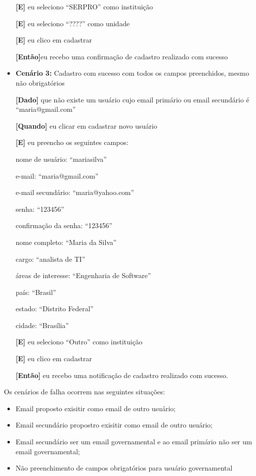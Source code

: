 \begin{itemize}
	\textbf{[E]} eu seleciono ``SERPRO'' como instituição

	\textbf{[E]} eu seleciono ``????'' como unidade  

	\textbf{[E]} eu clico em cadastrar

	\textbf{[Então]}eu recebo uma confirmação de cadastro realizado com sucesso

\item\textbf{Cenário 3:} Cadastro com sucesso com todos os campos preenchidos, mesmo não obrigatórios

	\textbf{[Dado]} que não existe um usuário cujo email primário ou email secundário é ``maria@gmail.com''

	\textbf{[Quando]} eu clicar em cadastrar novo usuário

	\textbf{[E]} eu preencho os seguintes campos: 

  		\subitem nome de usuário: ``mariasilva''

		  \subitem e-mail: ``maria@gmail.com''

		  \subitem e-mail secundário: ``maria@yahoo.com''

		  \subitem senha: ``123456''

		  \subitem confirmação da senha: ``123456''

		  \subitem nome completo: ``Maria da Silva''

		  \subitem cargo: ``analista de TI''

		  \subitem áreas de interesse: ``Engenharia de Software''

		  \subitem país: ``Brasil''

		  \subitem estado: ``Distrito Federal''

		  \subitem cidade: ``Brasília''

	\textbf{[E]} eu seleciono ``Outro'' como instituição 

	\textbf{[E]} eu clico em cadastrar

	\textbf{[Então]} eu recebo uma notificação de cadastro realizado com sucesso.
	\end{itemize}

	Os cenários de falha ocorrem nas seguintes situações:
	\begin{itemize}
	\item Email proposto exisitir como email de outro usuário;
	\item Email secundário propostro exisitir como email de outro usuário;
	\item Email secundário ser um email governamental e ao email primário não ser um email governamental;
	\item Não preenchimento de campos obrigatórios para usuário governamental 
	\end{itemize}


